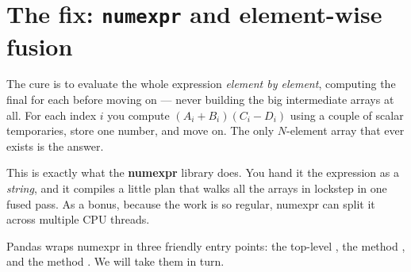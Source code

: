 \documentclass[11pt]{article}
\begin{document}
\section{The fix: \texttt{numexpr} and element-wise fusion}

The cure is to evaluate the whole expression \emph{element by element}, computing the final  for each  before moving on --- never building the big intermediate arrays at all. For each index $i$ you compute $(A_i + B_i)(C_i - D_i)$ using a couple of scalar temporaries, store one number, and move on. The only $N$-element array that ever exists is the answer.

This is exactly what the \textbf{numexpr} library does. You hand it the expression as a \emph{string}, and it compiles a little plan that walks all the arrays in lockstep in one fused pass. As a bonus, because the work is so regular, numexpr can split it across multiple CPU threads.

\begin{center}
\end{center}

Pandas wraps numexpr in three friendly entry points: the top-level , the method , and the method . We will take them in turn.
\end{document}
